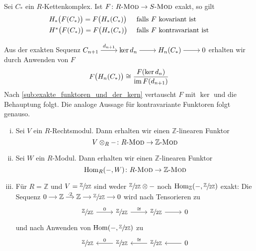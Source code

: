 \begin{bemerkung}[{name=[exakte Funktoren und (Ko-)Homologie]},label=bem:exakte_funktoren_homologie]
	Sei $C_*$ ein $R$-Kettenkomplex.
	Ist $F \colon \Mod{R} \to \Mod{S}$ exakt, so gilt
	\[
		\begin{array}{ll}
			H_* \enbrace[\big]{F(C_*)} = F \enbrace[\big]{H_*(C_*)} & \text{ falls $F$ kovariant ist} \\[4pt]
			H^* \enbrace[\big]{F(C_*)} = F \enbrace[\big]{H_*(C_*)} & \text{ falls $F$ kontravariant ist} 
		\end{array}
	\]
\end{bemerkung}
\begin{beweis}
	Aus der exakten Sequenz
	\(
		\begin{tikzcd}[cramped]
			C_{n+1} \rar["d_{n+1}"] & \ker d_n \rar & H_n(C_*) \rar & 0
		\end{tikzcd}
	\)
	erhalten wir durch Anwenden von $F$ 
	\[
		F \enbrace[\big]{H_n(C_*) } \cong \frac{F (\ker d_n)}{\im F(d_{n+1})}
	\]
	Nach \cref{sub:exakte_funktoren_und_der_kern} vertauscht $F$ mit $\ker$ und die Behauptung folgt.
	Die analoge Aussage für kontravariante Funktoren folgt genauso.
\end{beweis}

\begin{beispiel}[{name=[Tensorieren und Hom]}]
	\leavevmode
	\begin{enumerate}[(i)]
		\item Sei $V$ ein $R$-Rechtsmodul.
		Dann erhalten wir einen $\mathbb{Z}$-linearen Funktor 
		\[
			V \otimes_R {-} \colon \Mod{R} \to \Mod{\mathbb{Z}}
		\]
		\item Sei $W$ ein $R$-Modul. 
		Dann erhalten wir einen $\mathbb{Z}$-linearen Funktor
		\[
			\Hom_R(-,W) \colon \Mod{R} \to \Mod{\mathbb{Z}}
		\]
		\item Für $R=\mathbb{Z}$ und $V= \sfrac{\mathbb{Z}}{2 \mathbb{Z}}$ sind weder $\sfrac{\mathbb{Z}}{2 \mathbb{Z}} \otimes {-}$ noch $\Hom_\mathbb{Z} \enbrace*{-, \sfrac{\mathbb{Z}}{2 \mathbb{Z}}}$ exakt:
		Die Sequenz
		\(
			\begin{tikzcd}[sep=small, cramped]
				0 \rar & \mathbb{Z} \rar["\cdot 2"] & \mathbb{Z} \rar & \sfrac{\mathbb{Z}}{2 \mathbb{Z}} \rar & 0
			\end{tikzcd}
		\)
		wird nach Tensorieren zu 
		\[
			\begin{tikzcd}
				\sfrac{\mathbb{Z}}{2 \mathbb{Z}} \rar["0"] & \sfrac{\mathbb{Z}}{2 \mathbb{Z}} \rar["\cong"] & \sfrac{\mathbb{Z}}{2 \mathbb{Z}} \rar & 0
			\end{tikzcd}
		\]
		und nach Anwenden von $\Hom(-,\sfrac{\mathbb{Z}}{2 \mathbb{Z}})$ zu
		\[
			\begin{tikzcd}
				\sfrac{\mathbb{Z}}{2 \mathbb{Z}}  & \sfrac{\mathbb{Z}}{2 \mathbb{Z}} \lar["0"']  & \sfrac{\mathbb{Z}}{2 \mathbb{Z}}\lar["\cong"']  & 0 \lar
			\end{tikzcd}
		\]
	\end{enumerate}
\end{beispiel}

